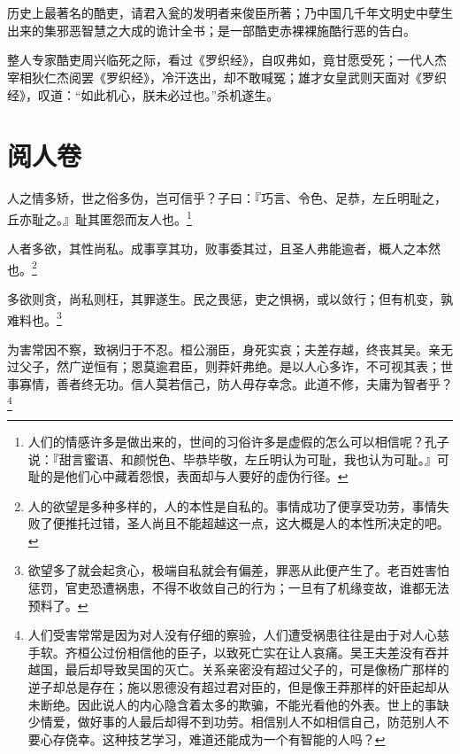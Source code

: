 \usemodule[memos]

\let\transpar\footnote

\chapter{}

历史上最著名的酷吏，请君入瓮的发明者来俊臣所著；乃中国几千年文明史中孽生出来的集邪恶智慧之大成的诡计全书；是一部酷吏赤裸裸施酷行恶的告白。

整人专家酷吏周兴临死之际，看过《罗织经》，自叹弗如，竟甘愿受死；一代人杰宰相狄仁杰阅罢《罗织经》，冷汗迭出，却不敢喊冤；雄才女皇武则天面对《罗织经》，叹道：“如此机心，朕未必过也。”杀机遂生。

\chapter{阅人卷}

人之情多矫，世之俗多伪，岂可信乎？子曰：『巧言、令色、足恭，左丘明耻之，丘亦耻之。』耻其匿怨而友人也。\transpar{人们的情感许多是做出来的，世间的习俗许多是虚假的怎么可以相信呢？孔子说：『甜言蜜语、和颜悦色、毕恭毕敬，左丘明认为可耻，我也认为可耻。』可耻的是他们心中藏着怨恨，表面却与人要好的虚伪行径。}

人者多欲，其性尚私。成事享其功，败事委其过，且圣人弗能逾者，概人之本然也。\transpar{人的欲望是多种多样的，人的本性是自私的。事情成功了便享受功劳，事情失败了便推托过错，圣人尚且不能超越这一点，这大概是人的本性所决定的吧。}

多欲则贪，尚私则枉，其罪遂生。民之畏惩，吏之惧祸，或以敛行；但有机变，孰难料也。\transpar{欲望多了就会起贪心，极端自私就会有偏差，罪恶从此便产生了。老百姓害怕惩罚，官吏恐遭祸患，不得不收敛自己的行为；一旦有了机缘变故，谁都无法预料了。}

为害常因不察，致祸归于不忍。桓公溺臣，身死实哀；夫差存越，终丧其吴。亲无过父子，然广逆恒有；恩莫逾君臣，则莽奸弗绝。是以人心多诈，不可视其表；世事寡情，善者终无功。信人莫若信己，防人毋存幸念。此道不修，夫庸为智者乎？\transpar{人们受害常常是因为对人没有仔细的察验，人们遭受祸患往往是由于对人心慈手软。齐桓公过份相信他的臣子，以致死亡实在让人哀痛。吴王夫差没有吞并越国，最后却导致吴国的灭亡。关系亲密没有超过父子的，可是像杨广那样的逆子却总是存在；施以恩德没有超过君对臣的，但是像王莽那样的奸臣起却从未断绝。因此说人的内心隐含着太多的欺骗，不能光看他的外表。世上的事缺少情爱，做好事的人最后却得不到功劳。相信别人不如相信自己，防范别人不要心存侥幸。这种技艺学习，难道还能成为一个有智能的人吗？}

